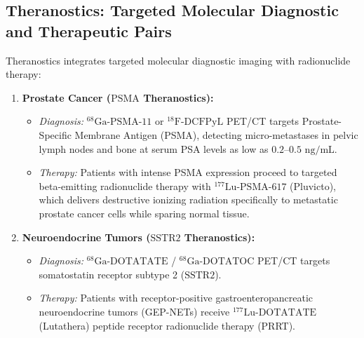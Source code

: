 \documentclass[11pt,a4paper]{article}
\begin{document}
\subsection{Theranostics: Targeted Molecular Diagnostic and Therapeutic Pairs}
Theranostics integrates targeted molecular diagnostic imaging with radionuclide therapy:
\begin{enumerate}[leftmargin=2em]
    \item \textbf{Prostate Cancer ($\text{PSMA}$ Theranostics):}
    \begin{itemize}
        \item \textit{Diagnosis:} $^{68}\text{Ga}\text{-PSMA-11}$ or $^{18}\text{F}\text{-DCFPyL}$ PET/CT targets Prostate-Specific Membrane Antigen (PSMA), detecting micro-metastases in pelvic lymph nodes and bone at serum PSA levels as low as $0.2\text{--}0.5\text{ ng/mL}$.
        \item \textit{Therapy:} Patients with intense PSMA expression proceed to targeted beta-emitting radionuclide therapy with \textbf{$^{177}\text{Lu}\text{-PSMA-617}$} (Pluvicto), which delivers destructive ionizing radiation specifically to metastatic prostate cancer cells while sparing normal tissue.
    \end{itemize}
    \item \textbf{Neuroendocrine Tumors ($\text{SSTR2}$ Theranostics):}
    \begin{itemize}
        \item \textit{Diagnosis:} $^{68}\text{Ga}\text{-DOTATATE}$ / $^{68}\text{Ga}\text{-DOTATOC}$ PET/CT targets somatostatin receptor subtype 2 ($\text{SSTR2}$).
        \item \textit{Therapy:} Patients with receptor-positive gastroenteropancreatic neuroendocrine tumors (GEP-NETs) receive \textbf{$^{177}\text{Lu}\text{-DOTATATE}$} (Lutathera) peptide receptor radionuclide therapy (PRRT).
    \end{itemize}
\end{enumerate}
\end{document}
